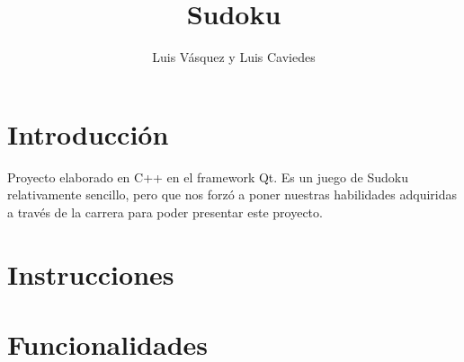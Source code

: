 \documentclass[12pt,oneside]{book}
\title{Sudoku}
\author{Luis Vásquez y Luis Caviedes}
\begin{document}
\maketitle
\tableofcontents
\chapter{Introducción}
Proyecto elaborado en C++ en el framework Qt. Es un juego de Sudoku relativamente sencillo, pero que nos forzó a poner nuestras habilidades adquiridas a través de la carrera para poder presentar este proyecto.
\chapter{Instrucciones}

\chapter{Funcionalidades}

\end{document}
